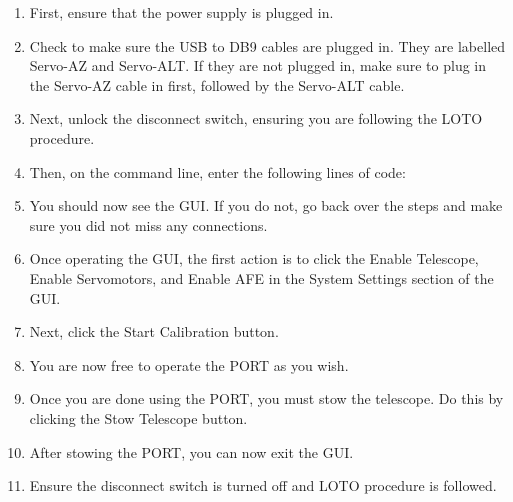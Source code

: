 \documentclass{article}
\begin{document}
\begin{enumerate}
	\item First, ensure that the power supply is plugged in.
	\item Check to make sure the USB to DB9 cables are plugged in. They are labelled Servo-AZ and Servo-ALT. If they are not plugged in, make sure to plug in the Servo-AZ cable in first,         followed by the Servo-ALT cable.
	\item Next, unlock the disconnect switch, ensuring you are following the LOTO procedure.
	\item Then, on the command line, enter the following lines of code:
	\item  You should now see the GUI. If you do not, go back over the steps and make sure you did not miss any connections.
	\item Once operating the GUI, the first action is to click the Enable Telescope, Enable Servomotors, and Enable AFE in the System Settings section of the GUI.
	\item Next, click the Start Calibration button.
	\item You are now free to operate the PORT as you wish.
	\item Once you are done using the PORT, you must stow the telescope. Do this by clicking the Stow Telescope button.
	\item After stowing the PORT, you can now exit the GUI.
	\item Ensure the disconnect switch is turned off and LOTO procedure is followed.

\end{enumerate}
\end{document}
